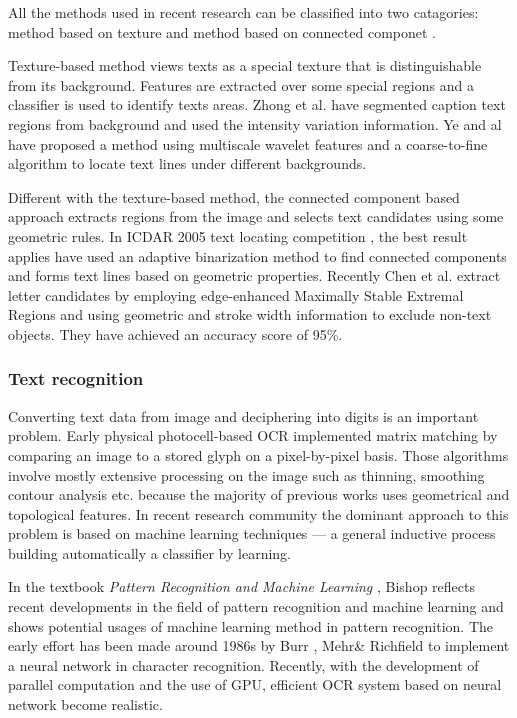 \documentclass[paper=a4, french, 11pt]{scrartcl}
\begin{document}
All the methods used in recent research can be classified into two catagories: method based on texture \cite{ye2003robust} \cite{kim2003texture} and method based on connected componet \cite{yin2014robust} \cite{ezaki2004text}.

Texture-based method views texts as a special texture that is distinguishable from its background. Features are extracted over some special regions and a classifier is used to identify texts areas. Zhong et al. \cite{zhong2000automatic} have segmented caption text regions from background and used the intensity variation information. Ye and al \cite{ye2003robust} have proposed a method using multiscale wavelet features and a coarse-to-fine algorithm to locate text lines under different backgrounds.

Different with the texture-based method, the connected component based approach extracts regions from the image and selects text candidates using some geometric rules. In ICDAR 2005 text locating competition \cite{lucas2005icdar}, the best result applies have used an adaptive binarization method to find connected components and forms text lines based on geometric properties. Recently Chen et al. \cite{chen2011robust} extract letter candidates by employing edge-enhanced Maximally Stable Extremal Regions and using geometric and stroke width information to exclude non-text objects. They have achieved an accuracy score of 95\%.

\subsubsection{Text recognition} \mbox{} \vspace{-0.5cm}

Converting text data from image and deciphering into digits is an important problem. Early physical photocell-based OCR implemented matrix matching by comparing an image to a stored glyph on a pixel-by-pixel basis. Those algorithms involve mostly extensive processing on the image such as thinning, smoothing contour analysis etc. because the majority of previous works uses geometrical and topological features. In recent research community the dominant approach to this problem is based on machine learning techniques --- a general inductive process building automatically a classifier by learning.

In the textbook \textit{Pattern Recognition and Machine Learning} \cite{anzai2012pattern}, Bishop reflects recent developments in the field of pattern recognition and machine learning and shows potential usages of machine learning method in pattern recognition. The early effort has been made around 1986s by Burr \cite{burr1988experiments}, Mehr\& Richfield \cite{rajavelu1989neural} to implement a neural network in character recognition. Recently, with the development of parallel computation and the use of GPU, efficient OCR system based on neural network become realistic. 
\end{document}
